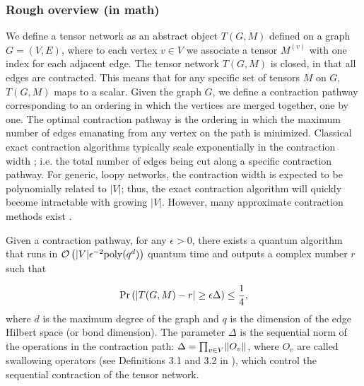 \begin{refsection}

\subsubsection*{Rough overview (in math)}


We define a tensor network as an abstract object $T(G,M)$ defined on a graph $G=(V,E)$, where to each vertex $v\in V$ we associate a tensor $M^{(v)}$ with one index for each adjacent edge. The tensor network $T(G,M)$ is closed, in that all edges are contracted. This means that for any specific set of tensors $M$ on $G$, $T(G,M)$ maps to a scalar.  Given the graph $G$, we define a contraction pathway corresponding to an ordering in which the vertices are merged together, one by one. The optimal contraction pathway is the ordering in which the maximum number of edges emanating from any vertex on the path  is minimized. Classical exact contraction algorithms typically scale exponentially in the contraction width \cite{gray2021hyper}; i.e. the total number of edges being cut along a specific contraction pathway. For generic, loopy networks, the contraction width is expected to be polynomially related to $|V|$; thus, the exact contraction algorithm will quickly become intractable with growing $|V|$. However, many approximate contraction methods exist \cite{orus2009simulation,gray2022hyper}.


Given a contraction pathway, for any $\epsilon >0$, there exists a quantum algorithm that runs in $\mathcal{O}\left( |V| \epsilon^{-2} {\rm poly}(q^d) \right)$ quantum time and outputs a complex number $r$ such that \cite{arad2010quantum} 

\begin{equation}\label{eqn:TNapprox}
{\rm Pr}\left(|T(G,M)-r|\geq \epsilon \Delta \right) \leq \frac{1}{4},    
\end{equation}
where $d$ is the maximum degree of the graph and $q$ is the dimension of the edge Hilbert space (or bond dimension). The parameter $\Delta$ is the sequential norm of the operations in the contraction path: $\Delta = \prod_{v\in V} \lVert O_v\rVert$, where $O_v$ are called swallowing operators (see Definitions 3.1 and 3.2 in \cite{arad2010quantum}), which control the sequential contraction of the tensor network. 


\end{refsection}
